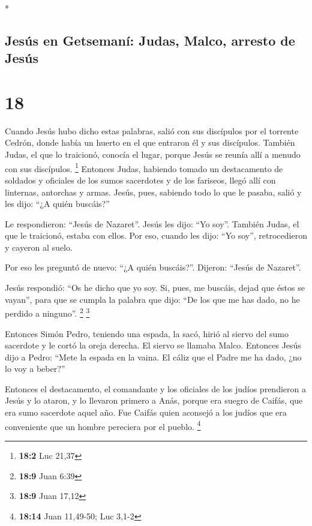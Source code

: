 \begin{paracol}{2}
\begin{otherlanguage}{english}
\end{otherlanguage}

\switchcolumn[0]*

\hypertarget{jesuxfas-en-getsemanuxed-judas-malco-arresto-de-jesuxfas}{%
\subsection{Jesús en Getsemaní: Judas, Malco, arresto de
Jesús}\label{jesuxfas-en-getsemanuxed-judas-malco-arresto-de-jesuxfas}}

\hypertarget{section-34}{%
\section{18}\label{section-34}}

 Cuando Jesús hubo dicho estas palabras, salió con sus
discípulos por el torrente Cedrón, donde había un huerto en el que
entraron él y sus discípulos.  También Judas, el que lo
traicionó, conocía el lugar, porque Jesús se reunía allí a menudo con
sus discípulos. \footnote{\textbf{18:2} Luc 21,37} 
Entonces Judas, habiendo tomado un destacamento de soldados y oficiales
de los sumos sacerdotes y de los fariseos, llegó allí con linternas,
antorchas y armas.  Jesús, pues, sabiendo todo lo que le
pasaba, salió y les dijo: ``¿A quién buscáis?''

 Le respondieron: ``Jesús de Nazaret''. Jesús les dijo:
``Yo soy''. También Judas, el que le traicionó, estaba con ellos.
 Por eso, cuando les dijo: ``Yo soy'', retrocedieron y
cayeron al suelo.

 Por eso les preguntó de nuevo: ``¿A quién buscáis?''.
Dijeron: ``Jesús de Nazaret''.

 Jesús respondió: ``Os he dicho que yo soy. Si, pues, me
buscáis, dejad que éstos se vayan'',  para que se cumpla
la palabra que dijo: ``De los que me has dado, no he perdido a
ninguno''. \footnote{\textbf{18:9} Juan 6:39} \footnote{\textbf{18:9}
  Juan 17,12}

 Entonces Simón Pedro, teniendo una espada, la sacó,
hirió al siervo del sumo sacerdote y le cortó la oreja derecha. El
siervo se llamaba Malco.  Entonces Jesús dijo a Pedro:
``Mete la espada en la vaina. El cáliz que el Padre me ha dado, ¿no lo
voy a beber?''

 Entonces el destacamento, el comandante y los oficiales
de los judíos prendieron a Jesús y lo ataron,  y lo
llevaron primero a Anás, porque era suegro de Caifás, que era sumo
sacerdote aquel año.  Fue Caifás quien aconsejó a los
judíos que era conveniente que un hombre pereciera por el pueblo.
\footnote{\textbf{18:14} Juan 11,49-50; Luc 3,1-2}


\end{paracol}
